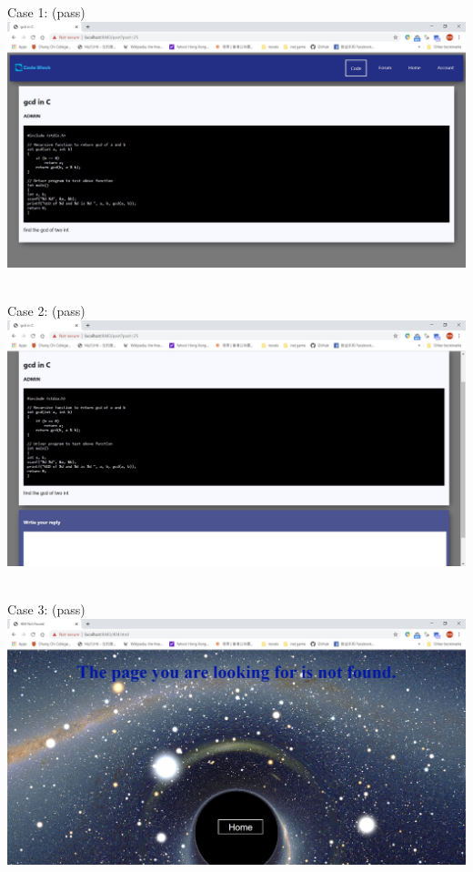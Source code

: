 Case 1: (pass)\\
\includegraphics[scale=0.45]{Doc/Pics/case-8-2-1}\\

~

Case 2: (pass)\\
\includegraphics[scale=0.45]{Doc/Pics/case-8-2-2}\\

~

Case 3: (pass)\\
\includegraphics[scale=0.45]{Doc/Pics/404}\\

